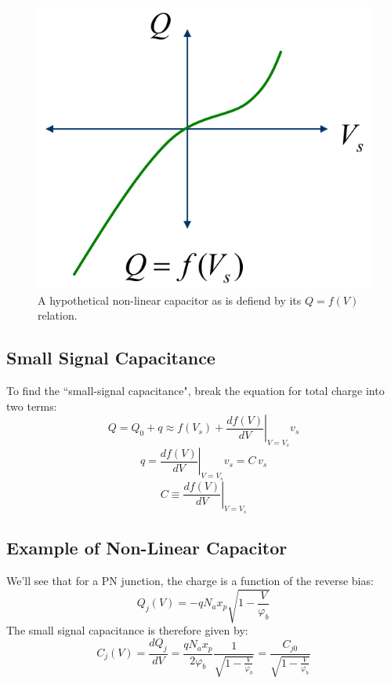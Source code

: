 \begin{figure}[tb]
\begin{center}
\includegraphics[width=.35\columnwidth]{mod2-2_ICtech_sld_20} 
\end{center}
\caption{A hypothetical non-linear capacitor as is defiend by its $Q = f(V)$ relation.} \label{fig:mod2-2_ICtech_sld_20}
\end{figure}

\subsection{Small Signal Capacitance}

To find the ``small-signal capacitance", break the equation for total charge into two terms:
\begin{equation} 
	Q = {Q_0} + q \approx f({V_s}) + {\left. {\frac{{df(V)}}{{dV}}} \right|_{V = {V_s}}}{v_s} 
\end{equation}
%
\begin{equation} 
	q = {\left. {\frac{{df(V)}}{{dV}}} \right|_{V = {V_s}}}{v_s} = C\,{v_s} 
\end{equation}
%
\begin{equation} 
	C \equiv {\left. {\frac{{df(V)}}{{dV}}} \right|_{V = {V_s}}} 
\end{equation}



\subsection{Example of Non-Linear Capacitor}

We’ll see that for a PN junction, the charge is a function of the reverse bias:
\begin{equation} 
	{Q_j}(V) =  - q{N_a}{x_p}\sqrt {1 - \frac{V}{{{\varphi _b}}}} 
\end{equation}
%
The small signal capacitance is therefore given by:
% 
\begin{equation} 
	{C_j}(V) = \frac{{dQ_j^{}}}{{dV}} = \frac{{q{N_a}{x_p}}}{{2{\varphi _b}}}\frac{1}{{\sqrt {1 - \frac{V}{{{\varphi _b}}}} }} = \frac{{C_{j0}^{}}}{{\sqrt {1 - \frac{V}{{{\varphi _b}}}} }} 
\end{equation}



